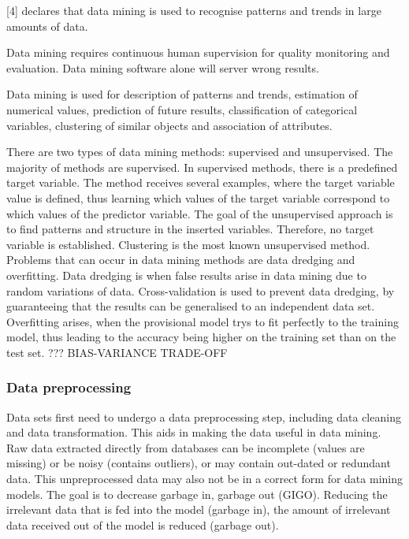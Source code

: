 
\textcite{DataMiningAndPredictiveAnalytics}[4] declares that data mining is used to recognise patterns and trends in large amounts of data.

Data mining requires continuous human supervision for quality monitoring and evaluation. Data mining software alone will server wrong results.

Data mining is used for description of patterns and trends, estimation of numerical values, prediction of future results, classification of categorical variables, clustering of similar objects and association of attributes.


There are two types of data mining methods: supervised and unsupervised.
The majority of methods are supervised. In supervised methods, there is a predefined target variable. The method receives several examples, where the target variable value is defined, thus learning which values of the target variable correspond to which values of the predictor variable.
The goal of the unsupervised approach is to find patterns and structure in the inserted variables. Therefore, no target variable is established. Clustering is the most known unsupervised method.
Problems that can occur in data mining methods are data dredging and overfitting. Data dredging is when false results arise in data mining due to random variations of data. Cross-validation is used to prevent data dredging, by guaranteeing that the results can be generalised to an independent data set. %
Overfitting arises, when the provisional model trys to fit perfectly to the training model, thus leading to the accuracy being higher on the training set than on the test set. ???
BIAS-VARIANCE  TRADE-OFF


\subsubsection{Data preprocessing}
Data sets first need to undergo a data preprocessing step, including data cleaning and data transformation. This aids in making the data useful in data mining. Raw data extracted directly from databases can be incomplete (values are missing) or be noisy (contains outliers), or may contain out-dated or redundant data. This unpreprocessed data may also not be in a correct form for data mining models. The goal is to decrease garbage in, garbage out (GIGO). Reducing the irrelevant data that is fed into the model (garbage in), the amount of irrelevant data received out of the model is reduced (garbage out).

